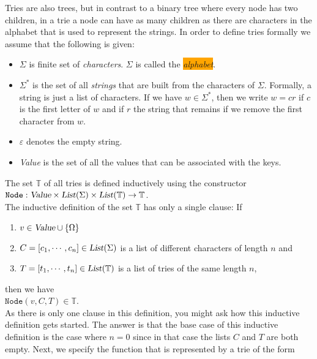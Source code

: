 Tries are also trees, but in contrast to a binary tree where every node has two children, in a trie a
node can have as many children as there are characters in the alphabet that is used to represent the
strings.  In order to define tries formally we assume that the following is given:
\begin{itemize}
\item $\Sigma$ is finite set of \emph{characters}. $\Sigma$ is called the
      \colorbox{orange}{\emph{alphabet}}. 
\item $\Sigma^*$ is the set of all \emph{strings} that are built from the characters of $\Sigma$.
      Formally, a string is just a list of characters.  If we have $w \in \Sigma^*$, then we write $w = cr$
      if $c$ is the first letter of $w$ and if $r$ the string that remains if we remove the first
      character from $w$.
\item $\varepsilon$ denotes the empty string.
\item \textsl{Value} is the set of all the values that can be associated with the keys.  
\end{itemize}
The set $\mathbb{T}$ of all tries is defined inductively using the constructor \\[0.2cm]
\hspace*{1.3cm} 
$\texttt{Node}: \textsl{Value} \times \textsl{List}(\Sigma) \times
\textsl{List}(\mathbb{T}) \rightarrow \mathbb{T}$. 
\\[0.2cm]
The inductive definition of the set $\mathbb{T}$ has only a single clause: If
\begin{enumerate}
\item $v \in \textsl{Value} \cup \{\Omega\}$
\item $C = [c_1, \cdots, c_n] \in \textsl{List}(\Sigma)$ is a list of different characters of length
      $n$ and
\item $T = [t_1, \cdots, t_n] \in \textsl{List}(\mathbb{T})$ is a list of  tries of the same length $n$, 
\end{enumerate}
then we have 
\\[0.2cm]
\hspace*{1.3cm}  $\texttt{Node}(v, C, T) \in \mathbb{T}$.  
\\[0.2cm]
As there is only one clause in this definition, you might ask how this inductive definition gets started.
The answer is that the base case of this inductive definition is the case where
$n=0$ since in that case the lists  $C$ and $T$ are both empty.
Next, we specify the function that is represented by a trie of the form 
